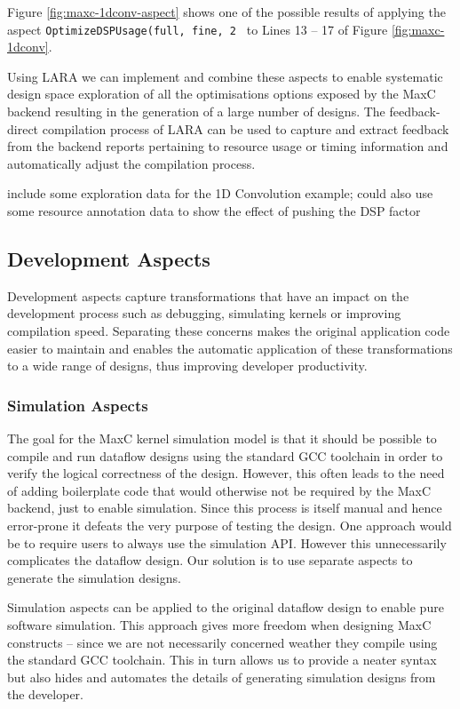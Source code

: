 Figure \ref{fig:maxc-1dconv-aspect} shows one of the possible results
of applying the aspect \texttt{OptimizeDSPUsage(full, fine, 2 } to
Lines 13 -- 17 of Figure \ref{fig:maxc-1dconv}.

Using LARA we can implement and combine these aspects to enable
systematic design space exploration of all the optimisations options
exposed by the MaxC backend resulting in the generation of a large
number of designs. The feedback-direct compilation process of LARA can
be used to capture and extract feedback from the backend reports
pertaining to resource usage or timing information and automatically
adjust the compilation process.

\TODO include some exploration data for the 1D Convolution example;
could also use some resource annotation data to show the effect of
pushing the DSP factor

\subsection{Development Aspects}

Development aspects capture transformations that have an impact on the
development process such as debugging, simulating kernels or improving
compilation speed. Separating these concerns makes the original
application code easier to maintain and enables the automatic
application of these transformations to a wide range of designs, thus
improving developer productivity.

\subsubsection{Simulation Aspects}

The goal for the MaxC kernel simulation model is that it should be
possible to compile and run dataflow designs using the standard GCC
toolchain in order to verify the logical correctness of the
design. However, this often leads to the need of adding boilerplate
code that would otherwise not be required by the MaxC backend, just to
enable simulation. Since this process is itself manual and hence
error-prone it defeats the very purpose of testing the design. One
approach would be to require users to always use the simulation
API. However this unnecessarily complicates the dataflow design. Our
solution is to use separate aspects to generate the simulation
designs.

Simulation aspects can be applied to the original dataflow design to
enable pure software simulation. This approach gives more freedom when
designing MaxC constructs -- since we are not necessarily concerned
weather they compile using the standard GCC toolchain. This in turn
allows us to provide a neater syntax but also hides and automates the
details of generating simulation designs from the developer.

